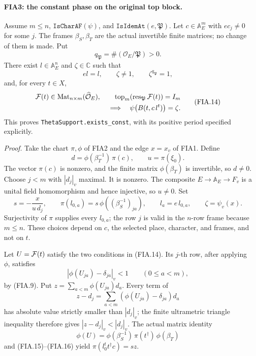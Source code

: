 \paragraph{FIA3: the constant phase on the original top block.}
\label{claim:FIA3}
Assume \(m\le n\), \(\texttt{IsCharAF}(\psi)\), and
\(\texttt{IsIdemAt}(e,\mathfrak P)\).
Let \(c\in\mathbb A_E^m\) with \(ec_j\ne0\) for some \(j\).
The frames \(\beta_S,\beta_T\) are the actual invertible finite
matrices; no change of them is made.  Put
\[
                         q_{\mathfrak P}
                            =\#(\mathcal O_E/\mathfrak P)>0.
 \tag{FIA.12}
\]
There exist \(l\in\mathbb A_E^n\) and \(\zeta\in\mathbb C\)
such that
\[
 el=l,\qquad \zeta\ne1,\qquad \zeta^{q_{\mathfrak P}}=1,
 \tag{FIA.13}
\]
and, for every \(t\in X\),
\[
 \begin{split}
 {\cal F}(t)\in\operatorname{Mat}_{n\times m}
                      (\widehat{\mathcal O}_E),\qquad
 \operatorname{top}_m(\operatorname{res}_{\mathfrak P}{\cal F}(t))=I_m\\
 \Longrightarrow\quad
            \psi\bigl(B(t,c\,l^t)\bigr)=\zeta .
 \end{split}                                                       \tag{FIA.14}
\]
This proves \texttt{ThetaSupport.exists\_const}, with its positive
period specified explicitly.

\emph{Proof.}
Take the chart \(\pi,\phi\) of FIA2 and the edge \(x=x_v\)
of FIA1.  Define
\[
 d=\phi(\beta_T^{-1})\,\pi(c),\qquad
 u=\pi(\xi_0).
 \tag{FIA.15}
\]
The vector \(\pi(c)\) is nonzero, and the finite matrix
\(\phi(\beta_T)\) is invertible, so \(d\ne0\).
Choose \(j<m\) with \(|d_j|_v\) maximal.  It is nonzero.
The composite \(E\to\mathbb A_E\to F_v\) is a unital
field homomorphism and hence injective, so \(u\ne0\).
Set
\[
 s=-\frac{x}{u\,d_j},\qquad
 \pi(l_{0,a})=s\,\phi((\beta_S^{-1})_{ja}),\qquad
 l_a=e\,l_{0,a},\qquad \zeta=\psi_v(x).
 \tag{FIA.16}
\]
Surjectivity of \(\pi\) supplies every \(l_{0,a}\);
the row \(j\) is valid in the \(n\)-row frame because \(m\le n\).
These choices depend on \(c\), the selected place, character,
and frames, and not on \(t\).

Let \(U={\cal F}(t)\) satisfy the two conditions in (FIA.14).
Its \(j\)-th row, after applying \(\phi\), satisfies
\[
          |\phi(U_{ja})-\delta_{ja}|_v<1
                             \qquad(0\le a<m),                  \tag{FIA.17}
\]
by (FIA.9).  Put \(z=\sum_{a<m}\phi(U_{ja})d_a\).
Every term of
\[
                  z-d_j=\sum_{a<m}
                         (\phi(U_{ja})-\delta_{ja})d_a
 \tag{FIA.18}
\]
has absolute value strictly smaller than \(|d_j|_v\);
the finite ultrametric triangle inequality therefore gives
\(|z-d_j|_v<|d_j|_v\).
The actual matrix identity
\[
       \phi(U)=\phi(\beta_S^{-1})\,\pi(t^\dagger)\,
                    \phi(\beta_T)
 \tag{FIA.19}
\]
and (FIA.15)--(FIA.16) yield
\(\pi(l_0^t t^\dagger c)=s z\).

